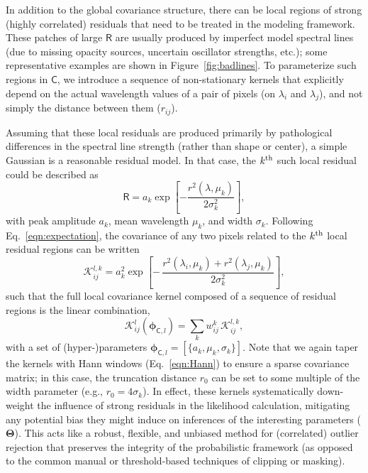 \documentclass[iop,floatfix,numberedappendix,twocolappendix]{emulateapj}
\newcommand{\vR}{\mathsf{R}}
\newcommand{\vC}{\mathsf{C}}
\newcommand{\vT}{ {\bm \Theta}}
\newcommand{\vp}{ {\bm \phi}}
\newcommand{\KK}{\mathcal{K}}
\newcommand{\Klocal}{\KK^l}
\begin{document}
In addition to the global covariance structure, there can be local regions of strong (highly 
correlated) residuals that need to be treated in the modeling framework.  These patches of large 
$\vR$ are usually produced by imperfect model spectral lines (due to missing opacity sources, 
uncertain oscillator strengths, etc.); some representative examples are shown in 
Figure~\ref{fig:badlines}.  To parameterize such regions in $\vC$, we introduce a sequence of 
non-stationary kernels that explicitly depend on the actual wavelength values of a pair of pixels 
(on $\lambda_i$ and $\lambda_j$), and not simply the distance between them ($r_{ij}$).  

Assuming that these local residuals are produced primarily by pathological differences in the 
spectral line strength (rather than shape or center), a simple Gaussian is a reasonable residual 
model.  In that case, the $k^{\rm th}$ such local residual could be described as
\begin{equation}
\vR = a_k \exp \left[ - \frac{r^2(\lambda,\mu_k)}{2\sigma_k^2} \right],
\end{equation}
with peak amplitude $a_k$, mean wavelength $\mu_k$, and width $\sigma_k$.  Following 
Eq.~\ref{eqn:expectation}, the covariance of any two pixels related to the $k^{\rm th}$ local 
residual regions can be written
\begin{equation} \label{eqn:kregion}
  \mathcal{K}^{l,k}_{ij} = a_k^2 \exp \left [ - \, \frac{r^2(\lambda_i, \mu_k) + r^2(\lambda_j, \mu_k)}{2 \sigma_k^2}\right ],
\end{equation}
such that the full local covariance kernel composed of a sequence of residual regions is the linear 
combination,
\begin{equation} \label{eqn:klocal}
\Klocal_{ij}(\vp_{{\mathsf C},l}) = \sum_k w^k_{ij} \, \mathcal{K}^{l,k}_{ij},
\end{equation}
with a set of (hyper-)parameters $\vp_{{\mathsf C},l} = [\{a_k, \mu_k, \sigma_k\}]$.  Note that we 
again taper the kernels with Hann windows (Eq.~\ref{eqn:Hann}) to ensure a sparse covariance 
matrix; in this case, the truncation distance $r_0$ can be set to some multiple of the width 
parameter (e.g., $r_0 = 4\sigma_k$).  In effect, these kernels systematically down-weight the 
influence of strong residuals in the likelihood calculation, mitigating any potential bias they 
might induce on inferences of the interesting parameters ($\vT$).  This acts like a robust, 
flexible, and unbiased method for (correlated) outlier rejection that preserves the integrity of 
the probabilistic framework (as opposed to the common manual or threshold-based techniques of 
clipping or masking).  
\end{document}
